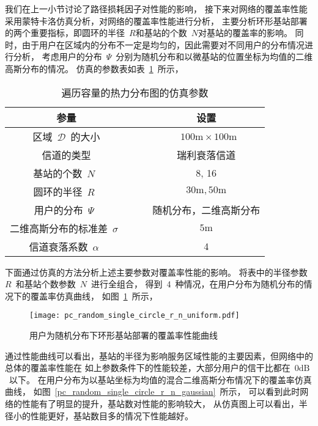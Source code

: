 我们在上一小节讨论了路径损耗因子对性能的影响，
接下来对网络的覆盖率性能采用蒙特卡洛仿真分析，对网络的覆盖率性能进行分析，
主要分析环形基站部署的两个重要指标，即圆环的半径~$R$和基站的个数~$N$对基站的覆盖率的影响。
同时，由于用户在区域内的分布不一定是均匀的，因此需要对不同用户的分布情况进行分析，
考虑用户的分布~$\Psi$~分别为随机分布和以微基站的位置坐标为均值的二维高斯分布的情况。
仿真的参数表如表~\ref{single_circle_pc_sim_para}~所示，
\begin{table}[htbp]
\caption{遍历容量的热力分布图的仿真参数}
\label{single_circle_pc_sim_para}
\vspace{0.5em}\centering\wuhao
\begin{tabular}{cccc}
\toprule[1.5pt]
参量 & & & 设置 \\
\midrule[0.5pt]
区域~$\mathcal{D}$~的大小  & & & ~$100\mathrm{m} \times 100 \mathrm{m}$ \\
信道的类型 & & &  瑞利衰落信道\\
基站的个数~$N$~ & & &  8, 16\\
圆环的半径~$R$~ & & &  ${30\mathrm{m}},{50\mathrm{m}}$\\
用户的分布~$\Psi$~ & & & 随机分布，二维高斯分布\\
二维高斯分布的标准差~$\sigma$~ & & & ${5\mathrm{m}}$\\
信道衰落系数~$\alpha$~  & & & 4\\
\bottomrule[1.5pt]
\end{tabular}
\end{table}
下面通过仿真的方法分析上述主要参数对覆盖率性能的影响。
将表中的半径参数~$R$~和基站个数参数~$N$~进行全组合，
得到~4~种情况，在用户分布为随机分布的情况下的覆盖率仿真曲线，
如图~\ref{pc_random_single_circle_r_n_uniform}~所示，
\begin{figure}[htbp]
\centering
\texttt{[image: pc\_random\_single\_circle\_r\_n\_uniform.pdf]}
\caption{用户为随机分布下环形基站部署的覆盖率性能曲线}\vspace{-0.5em}
\label{pc_random_single_circle_r_n_uniform}
\end{figure}
通过性能曲线可以看出，基站的半径为影响服务区域性能的主要因素，但网络中的总体的覆盖率性能在
如上参数条件下的性能较差，大部分用户的信干比都在~$0\mathrm{dB}$~以下。
在用户分布为以基站坐标为均值的混合二维高斯分布情况下的覆盖率仿真曲线，
如图~\ref{pc_random_single_circle_r_n_gaussian}~所示，
可以看到此时网络的性能有了明显的提升，基站数对性能的影响较大，
从仿真图上可以看出，半径小的性能更好，基站数目多的情况下性能越好。


